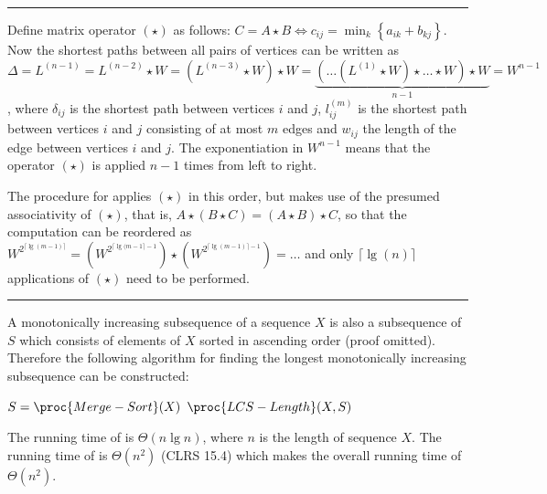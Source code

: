 \documentclass[a4paper,parskip=half]{scrartcl}
\newenvironment{solution}[1]{
\rule{\textwidth}{1pt}
\begin{description}[leftmargin=3em, style=nextline, topsep=0em,
font={\bfseries\rmfamily}]
\item[#1]
}{
\end{description}
}
\begin{document}
\begin{solution}{II-1}

Define matrix operator $(\star)$ as follows: $C = A \star B \iff c_{ij} =
\min_{k} \left\{ a_{ik} + b_{kj} \right\}$. Now the shortest paths between all
pairs of vertices can be written as $\Delta = L^{(n-1)} = L^{(n-2)} \star W =
(L^{(n-3)} \star W) \star W = \underbrace{ ( \ldots (L^{(1)} \star W) \star
\ldots \star W) \star W }_{n-1} = W^{n-1}$, where $\delta_{ij}$ is the shortest
path between vertices $i$ and $j$, $l_{ij}^{(m)}$ is the shortest path between
vertices $i$ and $j$ consisting of at most $m$ edges and $w_{ij}$ the length of
the edge between vertices $i$ and $j$. The exponentiation in $W^{n-1}$ means
that the operator $(\star)$ is applied $n-1$ times from left to right.

The procedure for  applies $(\star)$ in this
order, but  makes use of the presumed
associativity of $(\star)$, that is, $A \star (B \star C) = (A \star B) \star
C$, so that the computation can be reordered as $W^{2^{\lceil \lg(m-1) \rceil}}
= \left( W^{2^{\lceil \lg(m-1 \rceil - 1}} \right) \star \left( W^{2^{\lceil
\lg(m-1) \rceil - 1}} \right) = \ldots$ and only $\lceil \lg(n) \rceil$
applications of $(\star)$ need to be performed.

\end{solution}

\begin{solution}{II-2}

A monotonically increasing subsequence of a sequence $X$ is also a subsequence
of $S$ which consists of elements of $X$ sorted in ascending order (proof
omitted). Therefore the following algorithm for finding the longest
monotonically increasing subsequence can be constructed:

\begin{codebox}
\li $S =
\proc{Merge-Sort}(X)$
\li \Return $\proc{LCS-Length}(X,S)$
\end{codebox}

The running time of  is $\Theta(n \lg n)$, where $n$ is the
length of sequence $X$. The running time of  is $\Theta(n^2)$
(CLRS 15.4) which makes the overall running time of
 $\Theta(n^2)$.

\end{solution}
\end{document}
